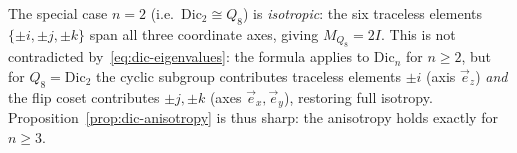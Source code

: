   \begin{remark}
    \label{rem:Dic2-iso}
    The special case $n = 2$ (i.e.\ $\mathrm{Dic}_2 \cong Q_8$) is \emph{isotropic}:
    the six traceless elements $\{\pm i, \pm j, \pm k\}$ span all three coordinate axes,
    giving $M_{Q_8} = 2I$.
    This is not contradicted by~\eqref{eq:dic-eigenvalues}: the formula applies to
    $\mathrm{Dic}_n$ for $n \ge 2$, but for $Q_8 = \mathrm{Dic}_2$ the cyclic subgroup
    contributes traceless elements $\pm i$ (axis $\vec{e}_z$) \emph{and} the flip coset
    contributes $\pm j, \pm k$ (axes $\vec{e}_x, \vec{e}_y$), restoring full isotropy.
    Proposition~\ref{prop:dic-anisotropy} is thus sharp: the anisotropy holds exactly for
    $n \ge 3$.
  \end{remark}
